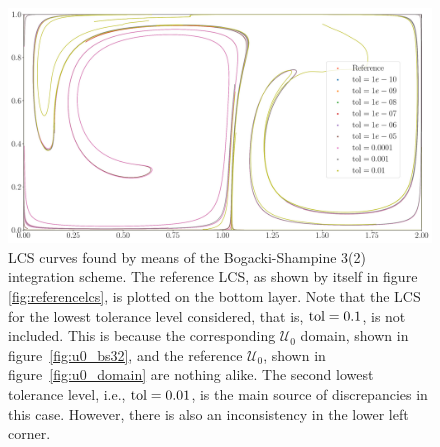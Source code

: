 \begin{figure}[htpb]
    \centering
    \includegraphics[width=0.9\linewidth]{figures/lcs_figures/rkbs32.pdf}
    \caption[LCS curves found by means of the Bogacki-Shampine 3(2) integration
    scheme]{
        LCS curves found by means of the Bogacki-Shampine 3(2) integration
        scheme. The reference LCS, as shown by itself in figure
        \ref{fig:referencelcs}, is plotted on the bottom layer. Note that
        the LCS for the lowest tolerance level considered, that is,
        $\textnormal{tol}=0.1$,
        is not included. This is because the corresponding $\mathcal{U}_{0}$
        domain, shown in figure~\ref{fig:u0_bs32}, and the reference
        $\mathcal{U}_{0}$, shown in figure~\ref{fig:u0_domain} are nothing
        alike. The second lowest tolerance level, i.e., $\textnormal{tol}=0.01$,
        is the main source of discrepancies in this case. However, there is
    also an inconsistency in the lower left corner.}
    \label{fig:lcs_rkbs32}
\end{figure}
